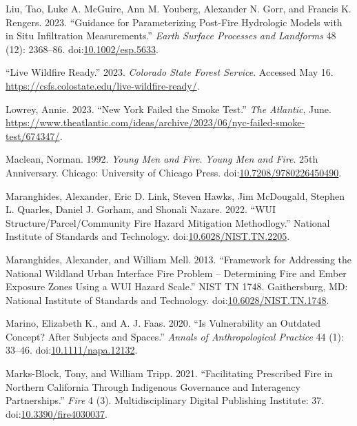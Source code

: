 \documentclass[
]{article}
\newlength{\cslhangindent}
\newenvironment{CSLReferences}[2] %
 {\begin{list}{}{%
  \setlength{\itemindent}{0pt}
  \setlength{\leftmargin}{0pt}
  \setlength{\parsep}{0pt}
  \ifodd #1
   \setlength{\leftmargin}{\cslhangindent}
   \setlength{\itemindent}{-1\cslhangindent}
  \fi
  \setlength{\itemsep}{#2\baselineskip}}}
 {\end{list}}
\begin{document}
\begin{CSLReferences}{1}{0}
Liu, Tao, Luke A. McGuire, Ann M. Youberg, Alexander N. Gorr, and Francis K. Rengers. 2023. {``Guidance for Parameterizing Post-Fire Hydrologic Models with in Situ Infiltration Measurements.''} \emph{Earth Surface Processes and Landforms} 48 (12): 2368--86. doi:\href{https://doi.org/10.1002/esp.5633}{10.1002/esp.5633}.

{``Live {Wildfire Ready}.''} 2023. \emph{Colorado State Forest Service}. Accessed May 16. \url{https://csfs.colostate.edu/live-wildfire-ready/}.

Lowrey, Annie. 2023. {``New {York Failed} the {Smoke Test}.''} \emph{The Atlantic}, June. \url{https://www.theatlantic.com/ideas/archive/2023/06/nyc-failed-smoke-test/674347/}.

Maclean, Norman. 1992. \emph{Young {Men} and {Fire}}. \emph{Young Men and Fire}. 25th Anniversary. Chicago: University of Chicago Press. doi:\href{https://doi.org/10.7208/9780226450490}{10.7208/9780226450490}.

Maranghides, Alexander, Eric D. Link, Steven Hawks, Jim McDougald, Stephen L. Quarles, Daniel J. Gorham, and Shonali Nazare. 2022. {``{WUI Structure}/{Parcel}/{Community Fire Hazard Mitigation Methodlogy}.''} {National Institute of Standards and Technology}. doi:\href{https://doi.org/10.6028/NIST.TN.2205}{10.6028/NIST.TN.2205}.

Maranghides, Alexander, and William Mell. 2013. {``Framework for {Addressing} the {National Wildland Urban Interface Fire Problem} -- {Determining Fire} and {Ember Exposure Zones} Using a {WUI Hazard Scale}.''} NIST TN 1748. Gaithersburg, MD: {National Institute of Standards and Technology}. doi:\href{https://doi.org/10.6028/NIST.TN.1748}{10.6028/NIST.TN.1748}.

Marino, Elizabeth K., and A. J. Faas. 2020. {``Is {Vulnerability} an {Outdated Concept}? {After Subjects} and {Spaces}.''} \emph{Annals of Anthropological Practice} 44 (1): 33--46. doi:\href{https://doi.org/10.1111/napa.12132}{10.1111/napa.12132}.

Marks-Block, Tony, and William Tripp. 2021. {``Facilitating {Prescribed Fire} in {Northern California} Through {Indigenous Governance} and {Interagency Partnerships}.''} \emph{Fire} 4 (3). Multidisciplinary Digital Publishing Institute: 37. doi:\href{https://doi.org/10.3390/fire4030037}{10.3390/fire4030037}.


\end{CSLReferences}
\end{document}
